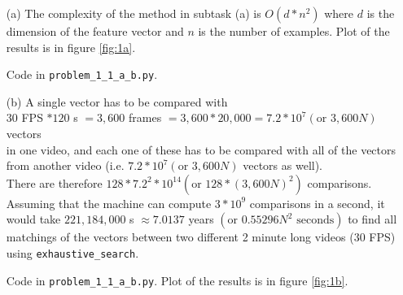 \documentclass [a4paper, 11pt] {article}
\begin{document}
\begin{enumerate}
	\item[(a)] The complexity of the method in subtask (a) is $O(d*n^2)$ where $d$ is the dimension of the feature vector and $n$ is the number of examples. Plot of the results is in figure \ref{fig:1a}.
	
	Code in \texttt{problem\_1\_1\_a\_b.py}.
		
	\item[(b)] A single vector has to be compared with \\
	$30$ FPS $* 120$ s $= 3,600$ frames $= 3,600 * 20,000 = 7.2 * 10^7 (\text{or } 3,600N)$ vectors \\
	in one video, and each one of these has to be compared with all of the vectors from another video (i.e. $7.2 * 10^7 (\text{or } 3,600N)$ vectors as well).\\
	There are therefore $128 * {7.2}^2 * 10^{14} (\text{or } 128 * (3,600N)^2)$ comparisons. Assuming that the machine can compute $3 * 10^9$ comparisons in a second, it would take $221,184,000$ s $\approx 7.0137$ years $(\text{or } 0.55296 N^2 \text{ seconds})$ to find all matchings of the vectors between two different 2 minute long videos ($30$ FPS) using \texttt{exhaustive\_search}.
	
	Code in \texttt{problem\_1\_1\_a\_b.py}. Plot of the results is in figure \ref{fig:1b}.
	

\end{enumerate}
\end{document}
